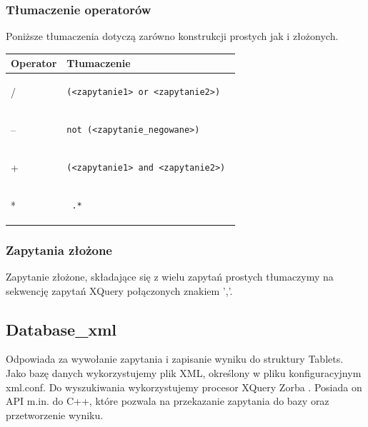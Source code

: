 \subsubsection{Tłumaczenie operatorów}
Poniższe tłumaczenia dotyczą zarówno konstrukcji prostych jak i złożonych.

\begin{longtable}{|p{1in}|p{3in}|}
\hline
{\bf Operator} & {\bf Tłumaczenie}\\
\hline
\endhead
/ & \begin{verbatim}(<zapytanie1> or <zapytanie2>) \end{verbatim} \\
\hline
-- & \begin{verbatim}not (<zapytanie_negowane>) \end{verbatim}\\  
\hline
+ & \begin{verbatim}(<zapytanie1> and <zapytanie2>) \end{verbatim}\\ 
\hline
* & \begin{verbatim} .*\end{verbatim}  \\ 
\hline
\end{longtable}

\subsubsection{Zapytania złożone}
Zapytanie złożone, składające się z wielu zapytań prostych tłumaczymy na sekwencję zapytań XQuery połączonych znakiem ','.

\subsection{Database\_xml}
Odpowiada za wywołanie zapytania i zapisanie wyniku do struktury Tablets.
Jako bazę danych wykorzystujemy plik XML, określony w pliku konfiguracyjnym xml.conf. 
Do wyszukiwania wykorzystujemy procesor XQuery Zorba \cite{zorba}. 
Posiada on API m.in. do C++, które pozwala na przekazanie zapytania do bazy oraz przetworzenie wyniku.
